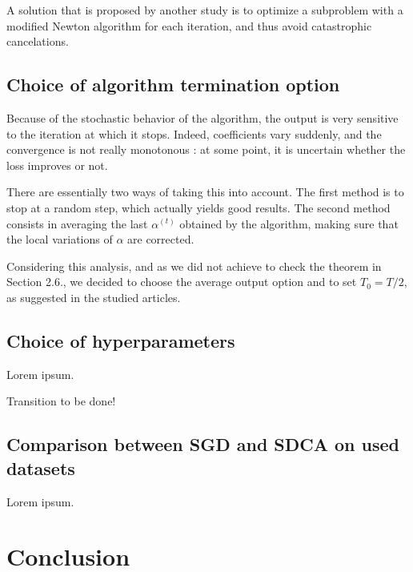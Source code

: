 \documentclass{article}
\begin{document}
A solution that is proposed by another study is to optimize a subproblem with a modified Newton algorithm for each iteration, and thus avoid catastrophic cancelations.

\subsection{Choice of algorithm termination option}

Because of the stochastic behavior of the algorithm, the output is very sensitive to the iteration at which it stops.
Indeed, coefficients vary suddenly, and the convergence is not really monotonous : at some point, it is uncertain whether the loss improves or not.

There are essentially two ways of taking this into account.
The first method is to stop at a random step, which actually yields good results.
The second method consists in averaging the last $\alpha^{(t)}$ obtained by the algorithm, making sure that the local variations of $\alpha$ are corrected.


Considering this analysis, and as we did not achieve to check the theorem in Section 2.6., we decided to choose the average output option and to set $T_0 = T/2$, as suggested in the studied articles.

\subsection{Choice of hyperparameters}

Lorem ipsum.

Transition to be done!

\subsection{Comparison between SGD and SDCA on used datasets}

Lorem ipsum.


\section*{Conclusion}
\end{document}
